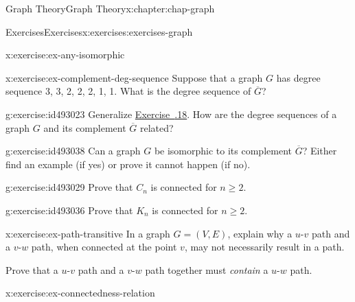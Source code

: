 \documentclass[oneside,10pt,]{book}
\newcommand{\xreffont}{\relax}
\numberwithin{equation}{section}
\begin{document}
\begin{chapterptx}{Graph Theory}{}{Graph Theory}{}{}{x:chapter:chap-graph}
\begin{exercises-section}{Exercises}{}{Exercises}{}{}{x:exercises:exercises-graph}
\begin{divisionexercise}{17}{}{}{x:exercise:ex-any-isomorphic}
\begin{sidebyside}{4}{0.015}{0.015}{0.03}
\begin{sbspanel}{0.22}
{
}%
\end{sbspanel}%
\end{sidebyside}%
\end{divisionexercise}%
\begin{divisionexercise}{18}{}{}{x:exercise:ex-complement-deg-sequence}%
Suppose that a graph \(G\) has degree sequence 3, 3, 2, 2, 2, 1, 1. What is the degree sequence of \(\overline{G}\)?%
\end{divisionexercise}%
\begin{divisionexercise}{19}{}{}{g:exercise:id493023}%
Generalize \hyperlink{x:exercise:ex-complement-deg-sequence}{Exercise~{\xreffont 5.8.18}}. How are the degree sequences of a graph \(G\) and its complement \(\overline{G}\) related?%
\end{divisionexercise}%
\begin{divisionexercise}{20}{}{}{g:exercise:id493038}%
Can a graph \(G\) be isomorphic to its complement \(\overline{G}\)? Either find an example (if yes) or prove it cannot happen (if no).%
\end{divisionexercise}%
\begin{divisionexercise}{21}{}{}{g:exercise:id493029}%
Prove that \(C_n\) is connected for \(n \geq 2\).%
\end{divisionexercise}%
\begin{divisionexercise}{22}{}{}{g:exercise:id493036}%
Prove that \(K_n\) is connected for \(n \geq 2\).%
\end{divisionexercise}%
\begin{divisionexercise}{23}{}{}{x:exercise:ex-path-transitive}%
In a graph \(G = (V,E)\), explain why a \(u\)-\(v\) path and a \(v\)-\(w\) path, when connected at the point \(v\), may not necessarily result in a path.%
\par
Prove that a \(u\)-\(v\) path and a \(v\)-\(w\) path together must \emph{contain} a \(u\)-\(w\) path.%
\end{divisionexercise}%
\begin{divisionexercise}{24}{}{}{x:exercise:ex-connectedness-relation}%

\end{divisionexercise}
\end{exercises-section}
\end{chapterptx}
\end{document}

